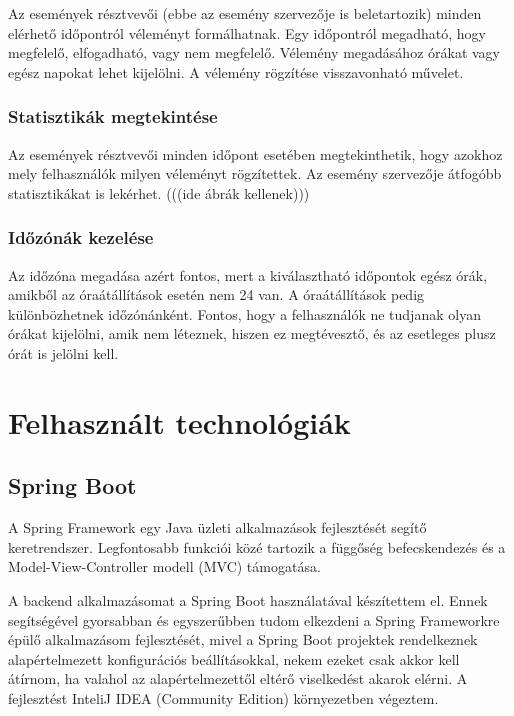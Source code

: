 \documentclass[a4paper,12pt]{report}
\theoremstyle{definition}
\theoremstyle{remark}
\begin{document}
Az események résztvevői (ebbe az esemény szervezője is beletartozik) minden elérhető időpontról véleményt formálhatnak. Egy időpontról megadható, hogy megfelelő, elfogadható, vagy nem megfelelő. Vélemény megadásához órákat vagy egész napokat lehet kijelölni. A vélemény rögzítése visszavonható művelet.

	\subsection{Statisztikák megtekintése}

Az események résztvevői minden időpont esetében megtekinthetik, hogy azokhoz mely felhasználók milyen véleményt rögzítettek. Az esemény szervezője átfogóbb statisztikákat is lekérhet. (((ide ábrák kellenek)))

	\subsection{Időzónák kezelése}

Az időzóna megadása azért fontos, mert a  kiválasztható időpontok egész órák, amikből az óraátállítások esetén nem 24 van. A óraátállítások pedig különbözhetnek időzónánként. Fontos, hogy a felhasználók ne tudjanak olyan órákat kijelölni, amik nem léteznek, hiszen ez megtévesztő, és az esetleges plusz órát is jelölni kell.

\chapter{Felhasznált technológiák}

\section{Spring Boot}

A Spring Framework egy Java üzleti alkalmazások fejlesztését segítő keretrendszer. Legfontosabb funkciói közé tartozik a függőség befecskendezés és a Model-View-Controller modell (MVC) támogatása.

A backend alkalmazásomat a Spring Boot használatával készítettem el. Ennek segítségével gyorsabban és egyszerűbben tudom elkezdeni a Spring Frameworkre épülő alkalmazásom fejlesztését, mivel a Spring Boot projektek rendelkeznek alapértelmezett konfigurációs beállításokkal, nekem ezeket csak akkor kell átírnom, ha valahol az alapértelmezettől eltérő viselkedést akarok elérni. A fejlesztést InteliJ IDEA (Community Edition) környezetben végeztem.
\end{document}
